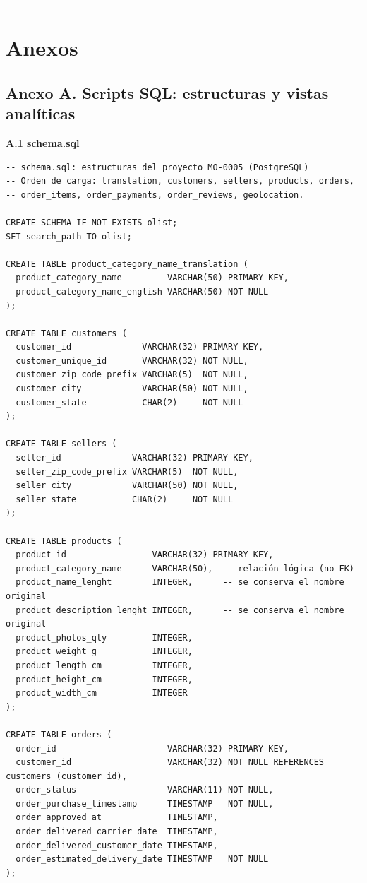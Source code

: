 \documentclass[a4paper,stu,12pt,donotrepeattitle,floatsintext]{apa7}
\begin{document}
\medskip\noindent\rule{\linewidth}{0.4pt}\medskip
\section{Anexos}
\subsection{Anexo A. Scripts SQL: estructuras y vistas analíticas}
\textbf{A.1 schema.sql}

\begin{lstlisting}
-- schema.sql: estructuras del proyecto MO-0005 (PostgreSQL)
-- Orden de carga: translation, customers, sellers, products, orders,
-- order_items, order_payments, order_reviews, geolocation.

CREATE SCHEMA IF NOT EXISTS olist;
SET search_path TO olist;

CREATE TABLE product_category_name_translation (
  product_category_name         VARCHAR(50) PRIMARY KEY,
  product_category_name_english VARCHAR(50) NOT NULL
);

CREATE TABLE customers (
  customer_id              VARCHAR(32) PRIMARY KEY,
  customer_unique_id       VARCHAR(32) NOT NULL,
  customer_zip_code_prefix VARCHAR(5)  NOT NULL,
  customer_city            VARCHAR(50) NOT NULL,
  customer_state           CHAR(2)     NOT NULL
);

CREATE TABLE sellers (
  seller_id              VARCHAR(32) PRIMARY KEY,
  seller_zip_code_prefix VARCHAR(5)  NOT NULL,
  seller_city            VARCHAR(50) NOT NULL,
  seller_state           CHAR(2)     NOT NULL
);

CREATE TABLE products (
  product_id                 VARCHAR(32) PRIMARY KEY,
  product_category_name      VARCHAR(50),  -- relación lógica (no FK)
  product_name_lenght        INTEGER,      -- se conserva el nombre original
  product_description_lenght INTEGER,      -- se conserva el nombre original
  product_photos_qty         INTEGER,
  product_weight_g           INTEGER,
  product_length_cm          INTEGER,
  product_height_cm          INTEGER,
  product_width_cm           INTEGER
);

CREATE TABLE orders (
  order_id                      VARCHAR(32) PRIMARY KEY,
  customer_id                   VARCHAR(32) NOT NULL REFERENCES customers (customer_id),
  order_status                  VARCHAR(11) NOT NULL,
  order_purchase_timestamp      TIMESTAMP   NOT NULL,
  order_approved_at             TIMESTAMP,
  order_delivered_carrier_date  TIMESTAMP,
  order_delivered_customer_date TIMESTAMP,
  order_estimated_delivery_date TIMESTAMP   NOT NULL
);


\end{lstlisting}
\end{document}
